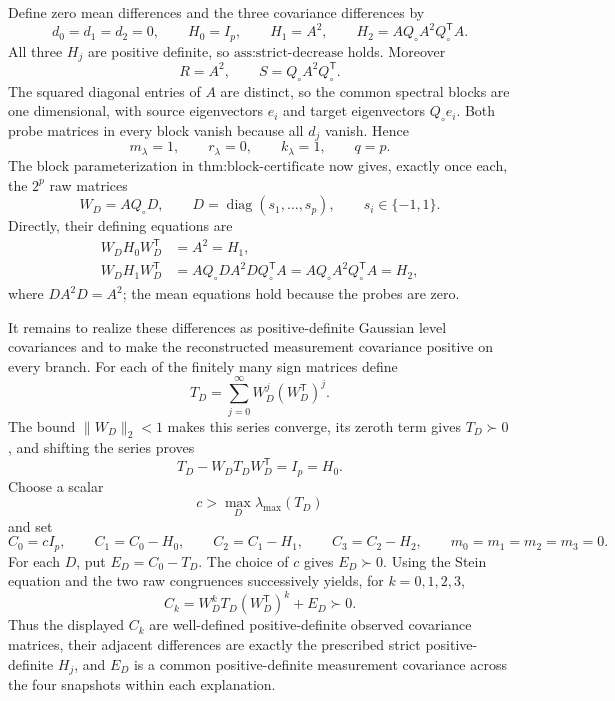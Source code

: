 Define zero mean differences and the three covariance differences by
\[
 d_0=d_1=d_2=0,
 \qquad H_0=I_p,
 \qquad H_1=A^2,
 \qquad H_2=AQ_\circ A^2Q_\circ^{\mathsf T}A.
\]
All three \(H_j\) are positive definite, so \(\text{ass:strict-decrease}\) holds.  Moreover
\[
 R=A^2,
 \qquad S=Q_\circ A^2Q_\circ^{\mathsf T}.
\]
The squared diagonal entries of \(A\) are distinct, so the common spectral blocks are one dimensional, with source eigenvectors \(e_i\) and target eigenvectors \(Q_\circ e_i\).  Both probe matrices in every block vanish because all \(d_j\) vanish.  Hence
\[
 m_\lambda=1,\qquad r_\lambda=0,\qquad k_\lambda=1,\qquad q=p.
\]
The block parameterization in \(\text{thm:block-certificate}\) now gives, exactly once each, the \(2^p\) raw matrices
\[
 W_D=AQ_\circ D,
 \qquad D=\operatorname{diag}(s_1,\ldots,s_p),
 \qquad s_i\in\{-1,1\}.
\]
Directly, their defining equations are
\[
 \begin{aligned}
 W_DH_0W_D^{\mathsf T}&=A^2=H_1,\\
 W_DH_1W_D^{\mathsf T}
 &=AQ_\circ DA^2DQ_\circ^{\mathsf T}A
 =AQ_\circ A^2Q_\circ^{\mathsf T}A=H_2,
 \end{aligned}
\]
where \(DA^2D=A^2\); the mean equations hold because the probes are zero.

It remains to realize these differences as positive-definite Gaussian level covariances and to make the reconstructed measurement covariance positive on every branch.  For each of the finitely many sign matrices define
\[
 T_D=\sum_{j=0}^{\infty}W_D^j(W_D^{\mathsf T})^j.
\]
The bound \(\lVert W_D\rVert_2<1\) makes this series converge, its zeroth term gives \(T_D\succ0\), and shifting the series proves
\[
 T_D-W_DT_DW_D^{\mathsf T}=I_p=H_0.
\]
Choose a scalar
\[
 c>\max_D\lambda_{\max}(T_D)
\]
and set
\[
 C_0=cI_p,\qquad C_1=C_0-H_0,\qquad
 C_2=C_1-H_1,\qquad C_3=C_2-H_2,\qquad m_0=m_1=m_2=m_3=0.
\]
For each \(D\), put \(E_D=C_0-T_D\).  The choice of \(c\) gives \(E_D\succ0\).  Using the Stein equation and the two raw congruences successively yields, for \(k=0,1,2,3\),
\[
 C_k=W_D^kT_D(W_D^{\mathsf T})^k+E_D\succ0.
\]
Thus the displayed \(C_k\) are well-defined positive-definite observed covariance matrices, their adjacent differences are exactly the prescribed strict positive-definite \(H_j\), and \(E_D\) is a common positive-definite measurement covariance across the four snapshots within each explanation.

